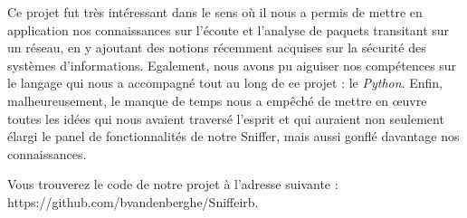 Ce projet fut très intéressant dans le sens où il nous a permis de mettre en application nos connaissances sur l'écoute et l'analyse de paquets transitant sur un réseau, en y ajoutant des notions récemment acquises sur la sécurité des systèmes d'informations. Egalement, nous avons pu aiguiser nos compétences sur le langage qui nous a accompagné tout au long de ce projet : le \emph{Python}. Enfin, malheureusement, le manque de temps nous a empêché de mettre en \oe uvre toutes les idées qui nous avaient traversé l'esprit et qui auraient non seulement élargi le panel de fonctionnalités de notre Sniffer, mais aussi gonflé davantage nos connaissances.

Vous trouverez le code de notre projet à l'adresse suivante : https://github.com/bvandenberghe/Sniffeirb.
